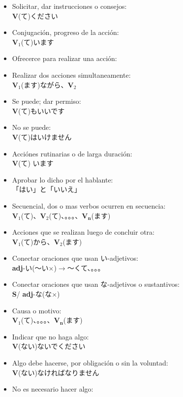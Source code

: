 \documentclass[a4paper,12pt,oneside]{report}
\def\to{$\longrightarrow$}
\def\bv{\textbf{V}} %
\def\bs{\textbf{S}} %
\def\adj{\textbf{adj}} %
\def\vi{$\mathrm{\bv}_1$} %
\def\vn{$\mathrm{\bv}_2$} %
\def\vene{$\mathrm{\bv}_\mathrm{\textbf{n}}$} %
\def\tenten{。。。}
\begin{document}
\begin{CJK*}{UTF8}{min}
  \begin{itemize}
    \item Solicitar, dar instrucciones o consejos:\\
          \bv(て)ください
    \item Conjugaci\'on, progreso de la acci\'on:\\
          \vi(て)います
    \item Ofrecerce para realizar una acci\'on:\\
    \item Realizar dos acciones simultaneamente:\\
          \vi(ます)ながら、\vn
    \item Se puede; dar permiso:\\
          \bv(て)もいいです
    \item No se puede:\\
          \bv(て)はいけません
    \item Acci\'ones rutinarias o de larga duraci\'on:\\
          \bv(て) います
    \item Aprobar lo dicho por el hablante:\\
          「はい」と「いいえ」
    \item Secuencial, dos o mas verbos ocurren en secuencia:\\
          \vi(て)、\vn(て)、\tenten、\vene(ます)
    \item Acciones que se realizan luego de concluir otra:\\
          \vi(て)から、\vn(ます)
    \item Conectar oraciones que usan い-adjetivos:\\
          \adj-い(〜い×)\to〜くて、\tenten
    \item Conectar oraciones que usan な-adjetivos o sustantivos:\\
          \bs / \adj-な(な×)
    \item Causa o motivo:\\
          \vi(て)、\tenten、\vene(ます)
    \item Indicar que no haga algo:\\
          \bv(ない)ないでください
    \item Algo debe hacerse, por obligación o sin la voluntad:\\
          \bv(ない)なければなりません
    \item No es necesario hacer algo:\\

\end{itemize}
\end{CJK*}
\end{document}
